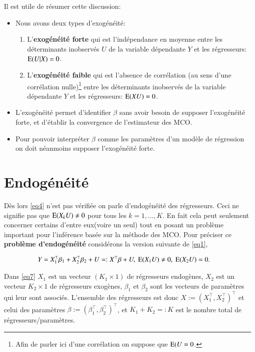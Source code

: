 Il est utile de résumer cette discussion:
\begin{itemize}[label = -]
	\item Nous avons deux types d'exogénéité: 
	\begin{enumerate}
		\item L'\textbf{exogénéité forte} qui est l'indépendance en moyenne entre les déterminants inobservés 
		$U$ de la variable dépendante $Y$ et les régresseurs: $\operatorname{E}(U|X) = 0$.
		\item L'\textbf{exogénéité faible} qui est l'absence de corrélation
		(au sens d'une corrélation nulle)\footnote{Afin de parler ici d'une corrélation on suppose que $\operatorname{E}(U=0$.} 
		entre les déterminants inobservés de la variable dépendante $Y$ et les régresseurs: $\operatorname{E}(XU) = 0$.
	\end{enumerate}
	\item L'exogénéité permet d'identifier $\beta$ sans avoir besoin de supposer l'exogénéité forte, et
	 d'établir la convergence de l'estimateur des MCO.
	 \item Pour pouvoir interpréter $\beta$ comme les paramètres d'un modèle de régression on doit 
	 néanmoins supposer l'exogénéité forte.
\end{itemize}


\section{Endogénéité}

Dès lors \eqref{eq4} n'est pas vérifiée on parle d'endogénéité des régresseurs. Ceci ne signifie pas que 
 $\operatorname{E}(X_k U) \neq 0 $ pour tous les $k = 1, \ldots, K$. En fait cela peut seulement concerner certains d'entre 
 eux(voire un seul) tout en posant un problème important pour l'inférence basée sur la méthode des MCO. 
 Pour préciser ce \textbf{problème d'endogénéité} considérons la version suivante de 
 \eqref{eq1},

 \begin{align}
	Y &= X_1^\top\beta_1 + X_2^\top\beta_2 + U =: X^\top\beta + U, \ \Exp(X_1U) \neq 0, \ \Exp(X_2U) = 0.
	\label{eq7}
\end{align}

Dans \eqref{eq7} $X_1$ est un vecteur $(K_1\times 1)$ de régresseurs endogènes, $X_2$ est un vecteur $K_2\times 1$  
de régresseurs exogènes, $\beta_1$ et $\beta_2$ sont les vecteurs de paramètres qui leur sont associés. L'ensemble des régresseurs est 
 donc $X := (X_1^\top, X_2^\top) ^\top$ et celui des paramètres $\beta := (\beta_1^\top, \beta_2^\top) ^\top$, et 
 $K_1 + K_2 =: K$ est le nombre total de régresseurs/paramètres.

